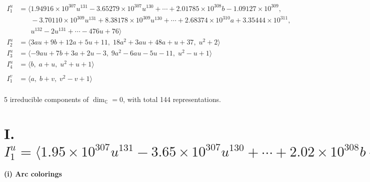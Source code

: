 \documentclass[1p]{elsarticle_modified}
\theoremstyle{definition}
\begin{document}
\begin{align*}
I^u_{1}&=\langle 
1.94916\times10^{307} u^{131}-3.65279\times10^{307} u^{130}+\cdots+2.01785\times10^{308} b-1.09127\times10^{309},\\
\phantom{I^u_{1}}&\phantom{= \langle  }-3.70110\times10^{309} u^{131}+8.38178\times10^{309} u^{130}+\cdots+2.68374\times10^{310} a+3.35444\times10^{311},\\
\phantom{I^u_{1}}&\phantom{= \langle  }u^{132}-2 u^{131}+\cdots-476 u+76\rangle \\
I^u_{2}&=\langle 
3 a u+9 b+12 a+5 u+11,\;18 a^2+3 a u+48 a+u+37,\;u^2+2\rangle \\
I^u_{3}&=\langle 
-9 a u+7 b+3 a+2 u-3,\;9 a^2-6 a u-5 u-11,\;u^2- u+1\rangle \\
I^u_{4}&=\langle 
b,\;a+u,\;u^2+u+1\rangle \\
\\
I^v_{1}&=\langle 
a,\;b+v,\;v^2- v+1\rangle \\
\end{align*}
\raggedright * 5 irreducible components of $\dim_{\mathbb{C}}=0$, with total 144 representations.\\
\newpage
\renewcommand{\arraystretch}{1}
\centering \section*{I. $I^u_{1}= \langle 1.95\times10^{307} u^{131}-3.65\times10^{307} u^{130}+\cdots+2.02\times10^{308} b-1.09\times10^{309},\;-3.70\times10^{309} u^{131}+8.38\times10^{309} u^{130}+\cdots+2.68\times10^{310} a+3.35\times10^{311},\;u^{132}-2 u^{131}+\cdots-476 u+76 \rangle$}
\flushleft \textbf{(i) Arc colorings}\\
\end{document}
